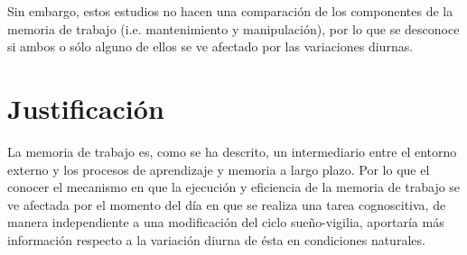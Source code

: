 \documentclass[12pt,letterpaper,final]{article}
\begin{document}


Sin embargo, estos estudios no hacen una comparación de los componentes de la memoria de trabajo (i.e. mantenimiento y manipulación), por lo que se desconoce si ambos o sólo alguno de ellos se ve afectado por las variaciones diurnas.

\section{Justificación}
La memoria de trabajo es, como se ha descrito, un intermediario entre el entorno externo y los procesos de aprendizaje y memoria a largo plazo. Por lo que el conocer el mecanismo en que la ejecución y eficiencia de la memoria de trabajo se ve afectada por el momento del día en que se realiza una tarea cognoscitiva, de manera independiente a una modificación del ciclo sueño-vigilia, aportaría más información respecto a la variación diurna de ésta en condiciones naturales. 
\end{document}
